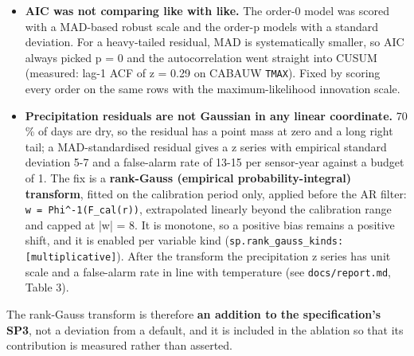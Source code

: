 \documentclass[10pt,a4paper]{article}
\begin{document}
\begin{itemize}
\item \textbf{AIC was not comparing like with like.} The order-\allowbreak{}0 model was scored with a
MAD-\allowbreak{}based robust scale and the order-\allowbreak{}p models with a standard deviation. For a heavy-\allowbreak{}tailed residual, MAD is systematically smaller, so AIC always picked p = 0 and the autocorrelation went straight into CUSUM (measured: lag-\allowbreak{}1 ACF of z = 0.29 on CABAUW \texttt{TMAX}). Fixed by scoring every order on the same rows with the maximum-\allowbreak{}likelihood innovation scale.

\item \textbf{Precipitation residuals are not Gaussian in any linear coordinate.} 70 \% of
days are dry, so the residual has a point mass at zero and a long right tail; a MAD-\allowbreak{}standardised residual gives a z series with empirical standard deviation 5-\allowbreak{}7 and a false-\allowbreak{}alarm rate of 13-\allowbreak{}15 per sensor-\allowbreak{}year against a budget of 1. The fix is a \textbf{rank-\allowbreak{}Gauss (empirical probability-\allowbreak{}integral) transform}, fitted on the calibration period only, applied before the AR filter: \texttt{w = Phi\textasciicircum{}-\allowbreak{}1(F\_\allowbreak{}cal(r))}, extrapolated linearly beyond the calibration range and capped at |\allowbreak{}w|\allowbreak{} = 8. It is monotone, so a positive bias remains a positive shift, and it is enabled per variable kind (\texttt{sp.rank\_\allowbreak{}gauss\_\allowbreak{}kinds: [multiplicative]}). After the transform the precipitation z series has unit scale and a false-\allowbreak{}alarm rate in line with temperature (see \texttt{docs/\allowbreak{}report.md}, Table 3).

\end{itemize}

The rank-\allowbreak{}Gauss transform is therefore \textbf{an addition to the specification's SP3}, not a deviation from a default, and it is included in the ablation so that its contribution is measured rather than asserted.
\end{document}
